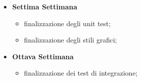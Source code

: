 {\begin{itemize}
\begin{itemize}
            \item sprint finale di sviluppo, inclusi test di integrazione.
        \end{itemize}
        \item \textbf{Settima Settimana} 
        \begin{itemize}
            \item finalizzazione degli unit test;
            \item finalizzazione degli stili grafici;
        \end{itemize}
        \item \textbf{Ottava Settimana} 
        \begin{itemize}
            \item finalizzazione dei test di integrazione;
        \end{itemize}
    \end{itemize}
}

\newcommand{\totaleOre}{}

\newcommand{\obiettiviObbligatori}{
	 \item \underline{\textit{O01}}: studio delle tecnologie richieste per lo sviluppo della soluzione;;
	 \item \underline{\textit{O02}}: definizione dell'architettura della soluzione;
	 \item \underline{\textit{O03}}: sviluppo della soluzione;
	 \item \underline{\textit{O04}}: verifica e validazione della soluzione;
	 
}

\newcommand{\obiettiviDesiderabili}{
	 \item \underline{\textit{D01}}: implementare workflow di Continous Integration (github actions / jenkins);
	 \item \underline{\textit{D02}}: secondo obiettivo;
}